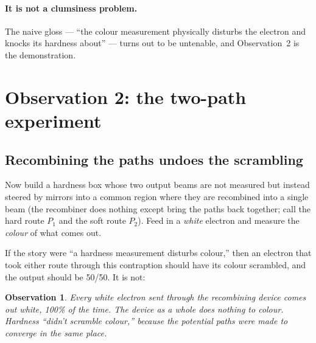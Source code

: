 \documentclass[11pt,a4paper]{article}
\newtheorem{obs}{Observation}
\theoremstyle{remark}
\begin{document}
\paragraph{It is not a clumsiness problem.}
The naive gloss --- ``the colour measurement physically disturbs the electron and
knocks its hardness about'' --- turns out to be untenable, and Observation~2 is the
demonstration.

\section{Observation 2: the two-path experiment}

\subsection{Recombining the paths undoes the scrambling}

Now build a hardness box whose two output beams are not measured but instead
steered by mirrors into a common region where they are recombined into a single
beam (the recombiner does nothing except bring the paths back together; call the
hard route $P_1$ and the soft route $P_2$). Feed in a \emph{white} electron and
measure the \emph{colour} of what comes out.

\begin{center}
\end{center}

If the story were ``a hardness measurement disturbs colour,'' then an electron
that took either route through this contraption should have its colour scrambled,
and the output should be 50/50. It is not:

\begin{obs}
Every white electron sent through the recombining device comes out \emph{white},
100\% of the time. The device as a whole does nothing to colour. Hardness ``didn't
scramble colour,'' because the potential paths were made to converge in the same
place.
\end{obs}
\end{document}
